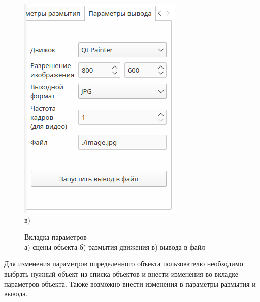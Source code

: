 \begin{figure}[h]
\begin{minipage}[h]{0.32\linewidth}
{            \includegraphics[width=\linewidth]{img/gui/tab3.png} \\ в)
            }
    \end{minipage}
    \caption{Вкладка параметров \\
    а) сцены объекта 
    б) размытия движения
    в) вывода в файл}
    \label{fig:gui_tabs}
\end{figure}

Для изменения параметров определенного объекта пользователю необходимо выбрать нужный объект из списка объектов и внести изменения во вкладке параметров объекта. Также возможно внести изменения в параметры размытия и вывода. 




